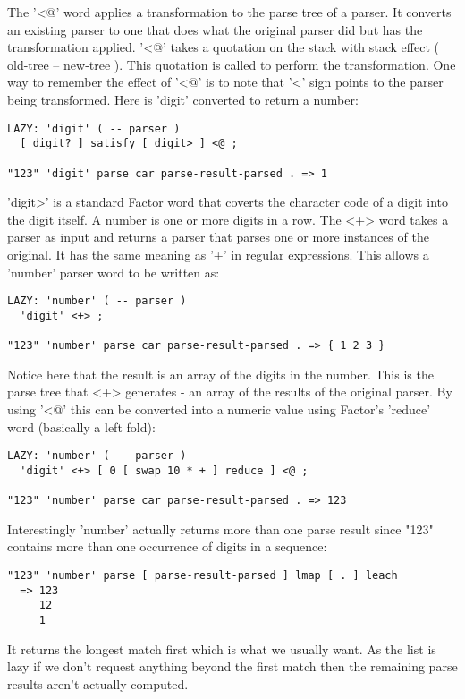 The '<@' word applies a transformation to the parse tree of a
parser. It converts an existing parser to one that does what the
original parser did but has the transformation applied. '<@' takes a
quotation on the stack with stack effect ( old-tree -- new-tree
). This quotation is called to perform the transformation. One way to
remember the effect of '<@' is to note that '<' sign points to the
parser being transformed. Here is 'digit' converted to return a
number:

\begin{verbatim}
LAZY: 'digit' ( -- parser )
  [ digit? ] satisfy [ digit> ] <@ ;

"123" 'digit' parse car parse-result-parsed . => 1
\end{verbatim}

'digit>' is a standard Factor word that coverts the character code of
a digit into the digit itself. A number is one or more digits in a
row. The <+> word takes a parser as input and returns a parser that
parses one or more instances of the original. It has the same meaning
as '+' in regular expressions. This allows a 'number' parser word to
be written as:

\begin{verbatim}
LAZY: 'number' ( -- parser )
  'digit' <+> ;

"123" 'number' parse car parse-result-parsed . => { 1 2 3 }
\end{verbatim}

Notice here that the result is an array of the digits in the
number. This is the parse tree that <+> generates - an array of the
results of the original parser. By using '<@' this can be converted
into a numeric value using Factor's 'reduce' word (basically a left
fold):

\begin{verbatim}
LAZY: 'number' ( -- parser )
  'digit' <+> [ 0 [ swap 10 * + ] reduce ] <@ ;

"123" 'number' parse car parse-result-parsed . => 123
\end{verbatim}

Interestingly 'number' actually returns more than one parse result
since "123" contains more than one occurrence of digits in a sequence:

\begin{verbatim}
"123" 'number' parse [ parse-result-parsed ] lmap [ . ] leach 
  => 123
     12
     1
\end{verbatim}

It returns the longest match first which is what we usually want. As
the list is lazy if we don't request anything beyond the first match
then the remaining parse results aren't actually computed.


